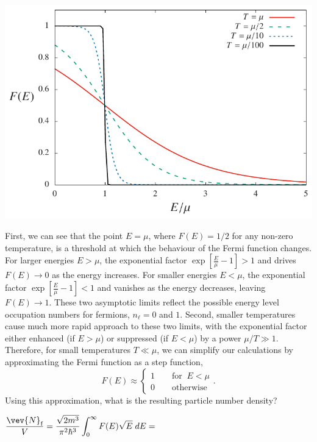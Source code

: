 \begin{center}\includegraphics[width=\textwidth]{figs/unit08_dist.pdf}\end{center}

First, we can see that the point $E = \mu$, where $F(E) = 1 / 2$ for any non-zero temperature, is a threshold at which the behaviour of the Fermi function changes.
For larger energies $E > \mu$, the exponential factor $\exp\left[\frac{E}{\mu} - 1\right] > 1$ and drives $F(E) \to 0$ as the energy increases.
For smaller energies $E < \mu$, the exponential factor $\exp\left[\frac{E}{\mu} - 1\right] < 1$ and vanishes as the energy decreases, leaving $F(E) \to 1$.
These two asymptotic limits reflect the possible energy level occupation numbers for fermions, $n_{\ell} = 0$ and $1$.
Second, smaller temperatures cause much more rapid approach to these two limits, with the exponential factor either enhanced (if $E > \mu$) or suppressed (if $E < \mu$) by a power $\mu / T \gg 1$.
Therefore, for small temperatures $T \ll \mu$, we can simplify our calculations by approximating the Fermi function as a step function,
\begin{equation}
  \label{eq:Fermi_step}
  F(E) \approx \left\{\begin{array}{l}1 \qquad \mbox{for } \ E < \mu \\
                                      0 \qquad \mbox{otherwise}\end{array}\right. .
\end{equation}
Using this approximation, what is the resulting particle number density?
\begin{mdframed}
  $\displaystyle \frac{\vev{N}_{\text{f}}}{V} = \frac{\sqrt{2m^3}}{\pi^2 \hbar^3} \int_0^{\infty} F(E) \sqrt{E} \; dE = $ \\[100 pt]
\end{mdframed}

